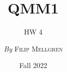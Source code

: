 

\title{QMM1}
\subtitle{HW 4}

\author{\textit{By} \textsc{Filip Mellgren}}
\date{Fall 2022}


	
	\maketitle
	
	
	
	


